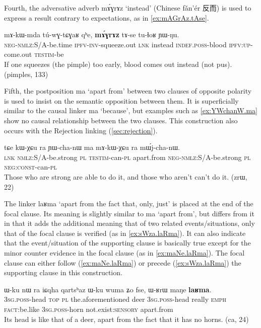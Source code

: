 \documentclass[oldfontcommands,oneside,a4paper,11pt]{article}
\newcommand{\ipa}[1]{{\phon \mbox{#1}}} %
\newcommand{\zh}[1]{{\cn #1}}
\begin{document}
Fourth, the adversative adverb \ipa{mɤ́ɣrɤz} `instead' (Chinese \ipa{fǎn'ér} \zh{反而}) is used to express a result contrary to expectations, as in  \ref{ex:mAGrAz.tAse}.  

\begin{exe}
\ex \label{ex:mAGrAz.tAse}
\gll
 \ipa{mɤ-kɯ-mda}    	\ipa{tú-wɣ-tɕɣaʁ}    	\ipa{qʰe,}    	\ipa{\textbf{mɤ́ɣrɤz}}    	\ipa{tɤ-se}    	\ipa{tu-ɬoʁ}    	\ipa{ɲɯ-ŋu.}    \\
 \textsc{neg-nmlz:S/A}-be.time \textsc{ipfv-inv}-squeeze.out \textsc{lnk} instead \textsc{indef.poss}-blood \textsc{ipfv:up}-come.out \textsc{testim}-be  \\
\glt If one squeezes (the pimple) too early, blood comes out instead (not pus). (pimples, 133)
 \end{exe}
 

Fifth, the  postposition \ipa{ma} `apart from' between two clauses of opposite polarity is used to insist on the semantic opposition between them.  It is superficially similar to the causal linker \ipa{ma} `because', but   examples such as \ref{ex:YWchanW.ma} show no causal relationship between the two clauses. This construction  also occurs with the Rejection linking (\ref{sec:rejection}).
\begin{exe}
\ex \label{ex:YWchanW.ma}
\gll
\ipa{tɕe}  	\ipa{kɯ-χɕu}  	\ipa{ra}  	\ipa{ɲɯ-cha-nɯ}  	\ipa{ma}  	\ipa{mɤ-kɯ-χɕu}  	\ipa{ra}  	\ipa{mɯ́j-cha-nɯ.}  \\
\textsc{lnk} \textsc{nmlz}:S/A-be.strong \textsc{pl} \textsc{testim}-can-\textsc{pl} apart.from \textsc{neg-nmlz}:S/A-be.strong \textsc{pl} \textsc{neg:const}-can-\textsc{pl} \\
\glt Those who are strong are able to do it, and those who aren't can't do it. (zrɯ, 22)
\end{exe}

The   linker  \ipa{laʁma} `apart from the fact that, only, just' is placed at the end of the focal clause. Its meaning is slightly similar to \ipa{ma} `apart from', but differs from it in that it adds the additional meaning that of two related events/situations, only that of the focal clause is verified (as in \ref{ex:sWza.laRma}). It can also indicate that the event/situation of the supporting clause is basically true except for the minor counter evidence in the focal clause  (as in \ref{ex:maNe.laRma}).   The focal clause can either follow (\ref{ex:maNe.laRma}) or precede (\ref{ex:sWza.laRma}) the supporting clause in this construction.
  \begin{exe}
\ex \label{ex:maNe.laRma}
\gll
\ipa{ɯ-ku}  	\ipa{nɯ} \ipa{ra}   	\ipa{iɕqha}  	\ipa{qartsʰaz}  	\ipa{ɯ-ku}  	\ipa{wuma}  	\ipa{ʑo}  	\ipa{fse,}  	\ipa{ɯ-ʁrɯ}  	\ipa{maŋe}  	\ipa{\textbf{laʁma}.}  	\\
\textsc{3sg.poss}-head \textsc{top} \textsc{pl} the.aforementioned deer \textsc{3sg.poss}-head  really \textsc{emph} \textsc{fact}:be.like \textsc{3sg.poss}-horn not.exist:\textsc{sensory} apart.from \\
\glt Its head is like that of a deer, apart from the fact that it has no  horns. (ca, 24)
\end{exe} 
\end{document}
